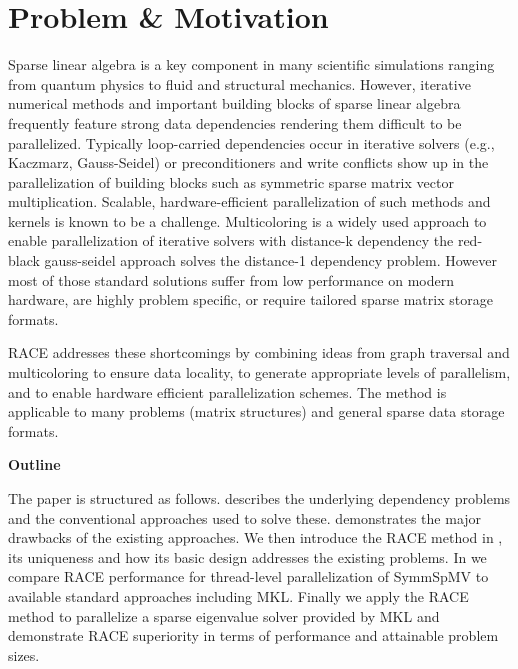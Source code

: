 	
\section{Problem \& Motivation}
	Sparse linear algebra is a key component in many scientific simulations
	ranging from quantum physics to fluid and structural mechanics.
	However, iterative numerical methods  
	and important building blocks of sparse linear algebra frequently feature strong 
	data dependencies rendering them difficult to be parallelized.
	Typically loop-carried dependencies occur in
	iterative solvers  (e.g., Kaczmarz, Gauss-Seidel) or preconditioners 
	and write conflicts show up in the parallelization of building blocks such 
	as symmetric sparse matrix vector multiplication.
	Scalable, hardware-efficient parallelization of such methods and kernels is known to be a 
	challenge. Multicoloring is a widely used approach to enable parallelization
	of iterative solvers with distance-k dependency \eg the 
	red-black gauss-seidel approach solves the distance-1 dependency problem.
	However most of those standard solutions suffer from low performance
	on modern hardware, are highly problem specific, or require tailored
    sparse matrix storage formats.

	\Acrshort{RACE} addresses these shortcomings by combining ideas from graph traversal
	and multicoloring to ensure data locality, to generate appropriate levels of parallelism,
	and to enable hardware efficient parallelization schemes. The method is applicable
	to many problems (\ie matrix structures) and general sparse data storage formats.
	

\noindent\textbf{Outline}


\noindent	The paper is structured as follows.  describes
	the underlying dependency problems and the conventional
	approaches used to solve these.  
	demonstrates the major drawbacks of the existing 
	approaches. We then introduce the \acrshort{RACE} method in ,
	its uniqueness and how its basic design addresses the existing problems. 
	In  we compare \acrshort{RACE} performance for thread-level parallelization of \acrfull{SymmSpMV} to
	available standard approaches including \acrshort{MKL}. Finally we apply the \acrshort{RACE}
	method to parallelize a sparse eigenvalue solver provided by \acrshort{MKL} and demonstrate  \acrshort{RACE} superiority in terms of performance and attainable problem sizes. 
		
